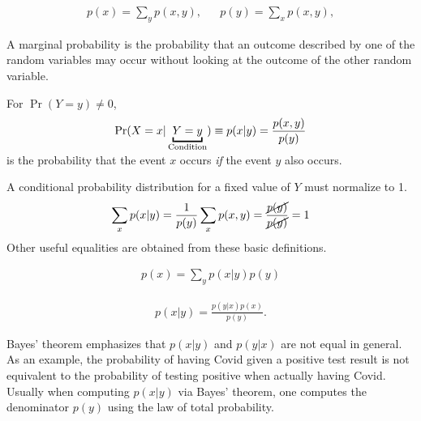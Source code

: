 \begin{definition}\leavevmode
	\begin{align}
		p(x) = \sum_y p(x,y), && p(y) = \sum_x p(x,y),
	\end{align}
\end{definition}
\noindent A marginal probability is the probability that an outcome described by one of the random variables may occur without looking at the outcome of the other random variable.

\begin{definition}\leavevmode
		
	For $\Pr(Y=y) \neq 0$,
	\begin{align}
		\Pr(\smash{X=x|\underbracket{Y=y}_{\textrm{Condition}}}) \equiv p(x|y) = \frac{p(x,y)}{p(y)}
	\end{align}
	is the probability that the event $x$ occurs \emph{if} the event $y$ also occurs.
\end{definition}
\noindent A conditional probability distribution for a fixed value of $Y$ must normalize to 1.
\begin{align}
	\sum_x p(x|y) = \frac{1}{p(y)} \sum_x p(x,y) = \frac{\cancel{p(y)}}{\cancel{p(y)}} = 1
\end{align}
Other useful equalities are obtained from these basic definitions.
\begin{lemma}\leavevmode
	\begin{align}
		p(x) = \sum_y p(x|y)p(y)
	\end{align}
\end{lemma}

\begin{lemma}\leavevmode
	\begin{align}
		p(x|y) = \frac{p(y|x)p(x)}{p(y)}.
	\end{align}
\end{lemma}
\noindent Bayes' theorem emphasizes that $p(x|y)$ and $p(y|x)$ are not equal in general. As an example, the probability of having Covid given a positive test result is not equivalent to the probability of testing positive when actually having Covid.
Usually when computing $p(x|y)$ via Bayes' theorem, one computes the denominator $p(y)$ using the law of total probability.

